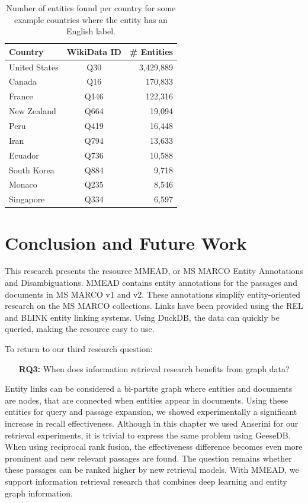 \begin{table}[]
	\caption{Number of entities found per country for some example countries where the entity has an English label.}
	\label{tab:country_entities}
	\centering
	\begin{tabular}{l|c|r}
		\toprule
		Country & WikiData ID & \# Entities\\
		\midrule
		United States & Q30 & 3,429,889 \\
		Canada & Q16 & 170,833 \\
		France & Q146 & 122,316 \\
		New Zealand & Q664 & 19,094\\
		Peru & Q419 & 16,448 \\
		Iran & Q794 & 13,633\\
		Ecuador & Q736 & 10,588 \\
		South Korea & Q884 & 9,718\\
		Monaco & Q235 & 8,546\\
		Singapore & Q334 & 6,597\\
		\bottomrule
	\end{tabular}
\end{table}

\section{Conclusion and Future Work}
This research presents the resource MMEAD, or MS MARCO Entity Annotations and Disambiguations. MMEAD contains entity annotations for the passages and documents in MS MARCO v1 and v2. These annotations simplify entity-oriented research on the MS MARCO collections. Links have been provided using the REL and BLINK entity linking systems. Using DuckDB, the data can quickly be queried, making the resource easy to use.
 
To return to our third research question:
\begin{itemize}
	\item[\textbf{RQ3:}] When does information retrieval research benefits from graph data?
\end{itemize}   

Entity links can be considered a bi-partite graph where entities and documents are nodes, that are connected when entities appear in documents. Using these entities for query and passage expansion, we showed experimentally a significant increase in recall effectiveness. Although in this chapter we used Anserini for our retrieval experiments, it is trivial to express the same problem using GeeseDB. When using reciprocal rank fusion, the effectiveness difference becomes even more prominent and new relevant passages are found. The question remains whether these passages can be ranked higher by new retrieval models. With MMEAD, we support information retrieval research that combines deep learning and entity graph information. 


